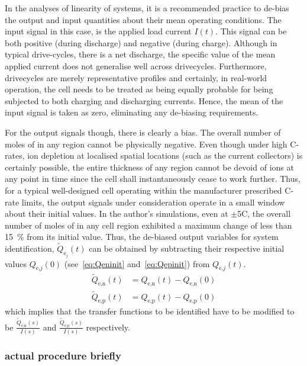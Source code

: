 In the analyses of linearity of systems, it is a recommended practice to de-bias
the output and input quantities about their mean operating conditions. The input
signal in this case, is the applied load current $I(t)$. This signal can be both
positive (during  discharge) and negative  (during charge). Although  in typical
drive-cycles, there is  a net discharge, the specific value  of the mean applied
current does  not generalise  well across drivecycles.  Furthermore, drivecycles
are merely representative  profiles and certainly, in  real-world operation, the
cell needs to be  treated as being equally probable for  being subjected to both
charging and discharging currents. Hence, the  mean of the input signal is taken
as zero, eliminating any de-biasing requirements.

For the output  signals though, there is  clearly a bias. The  overall number of
moles of   in  any region  cannot be  physically negative.  Even though
under  high C-rates,  ion  depletion  at localised  spatial  locations (such  as
the  current collectors)  is certainly  possible,  the entire  thickness of  any
region  cannot be  devoid of  ions at  any point  in time  since the  cell shall
instantaneously  cease  to  work  further. Thus,  for  a  typical  well-designed
cell  operating within  the manufacturer  prescribed C-rate  limits, the  output
signals  under consideration  operate  in  a small  window  about their  initial
values. In  the author's  simulations, even  at $\pm$5C,  the overall  number of
moles  of   in  any cell  region  exhibited a  maximum  change of  less
than  \SI{15}{\percent}  from its  initial  value.  Thus, the  de-biased  output
variables  for  system  identification, $\widetilde{Q}_{\text{e}_j}(t)$  can  be
obtained  by subtracting  their  respective  initial values  $Q_{\text{e,}j}(0)$
(see~\cref{eq:Qeninit} and~\cref{eq:Qepinit}) from $Q_{\text{e,}j}(t)$.
\begin{align}
    \widetilde{Q}_\text{e,n}(t) &= {Q}_\text{e,n}(t) - {Q}_\text{e,n}(0) \\
    \widetilde{Q}_\text{e,p}(t) &= {Q}_\text{e,p}(t) - {Q}_\text{e,p}(0)
\end{align}
which   implies   that   the   transfer  functions   to   be   identified   have
to   be   modified    to   be   $\frac{\widetilde{Q}_\text{e,n}(s)}{I(s)}$   and
$\frac{\widetilde{Q}_\text{e,p}(s)}{I(s)}$ respectively.

\subsubsection*{actual procedure briefly}\label{subsubsec:actualsysid}



